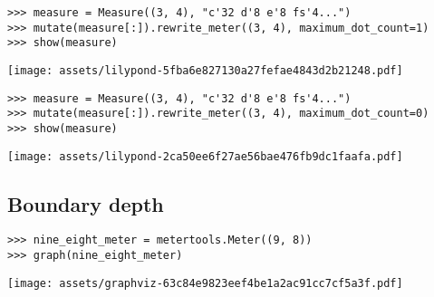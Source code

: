 \begin{comment}
<abjad>
measure = Measure((3, 4), "c'32 d'8 e'8 fs'4...")
mutate(measure[:]).rewrite_meter((3, 4), maximum_dot_count=1)
show(measure)
</abjad>
\end{comment}

\begin{singlespacing}
\vspace{-0.5\baselineskip}
\begin{lstlisting}
>>> measure = Measure((3, 4), "c'32 d'8 e'8 fs'4...")
>>> mutate(measure[:]).rewrite_meter((3, 4), maximum_dot_count=1)
>>> show(measure)
\end{lstlisting}
\noindent\texttt{[image: assets/lilypond-5fba6e827130a27fefae4843d2b21248.pdf]}
\end{singlespacing}

\begin{comment}
<abjad>
measure = Measure((3, 4), "c'32 d'8 e'8 fs'4...")
mutate(measure[:]).rewrite_meter((3, 4), maximum_dot_count=0)
show(measure)
</abjad>
\end{comment}

\begin{singlespacing}
\vspace{-0.5\baselineskip}
\begin{lstlisting}
>>> measure = Measure((3, 4), "c'32 d'8 e'8 fs'4...")
>>> mutate(measure[:]).rewrite_meter((3, 4), maximum_dot_count=0)
>>> show(measure)
\end{lstlisting}
\noindent\texttt{[image: assets/lilypond-2ca50ee6f27ae56bae476fb9dc1faafa.pdf]}
\end{singlespacing}

\subsection{Boundary depth} %

\begin{comment}
<abjad>
nine_eight_meter = metertools.Meter((9, 8))
graph(nine_eight_meter)
</abjad>
\end{comment}

\begin{singlespacing}
\vspace{-0.5\baselineskip}
\begin{lstlisting}
>>> nine_eight_meter = metertools.Meter((9, 8))
>>> graph(nine_eight_meter)
\end{lstlisting}
\noindent\texttt{[image: assets/graphviz-63c84e9823eef4be1a2ac91cc7cf5a3f.pdf]}
\end{singlespacing}

